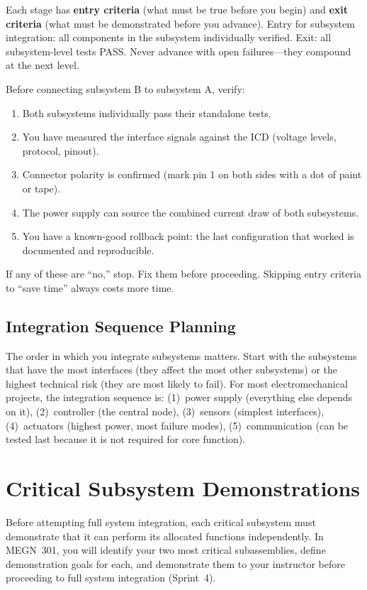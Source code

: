 \documentclass[11pt,letterpaper,twoside,openany]{book}
\begin{document}
Each stage has \textbf{entry criteria} (what must be true before you begin) and \textbf{exit criteria} (what must be demonstrated before you advance). Entry for subsystem integration: all components in the subsystem individually verified. Exit: all subsystem-level tests PASS. Never advance with open failures---they compound at the next level.

\begin{tipbox}
Before connecting subsystem B to subsystem A, verify:
\begin{enumerate}[nosep]
\item Both subsystems individually pass their standalone tests.
\item You have measured the interface signals against the ICD (voltage levels, protocol, pinout).
\item Connector polarity is confirmed (mark pin 1 on both sides with a dot of paint or tape).
\item The power supply can source the combined current draw of both subsystems.
\item You have a known-good rollback point: the last configuration that worked is documented and reproducible.
\end{enumerate}
If any of these are ``no,'' stop. Fix them before proceeding. Skipping entry criteria to ``save time'' always costs more time.
\end{tipbox}

\subsection{Integration Sequence Planning}
The order in which you integrate subsystems matters. Start with the subsystems that have the most interfaces (they affect the most other subsystems) or the highest technical risk (they are most likely to fail). For most electromechanical projects, the integration sequence is: (1)~power supply (everything else depends on it), (2)~controller (the central node), (3)~sensors (simplest interfaces), (4)~actuators (highest power, most failure modes), (5)~communication (can be tested last because it is not required for core function).

\FloatBarrier
\section{Critical Subsystem Demonstrations}
Before attempting full system integration, each critical subsystem must demonstrate that it can perform its allocated functions independently. In MEGN~301, you will identify your two most critical subassemblies, define demonstration goals for each, and demonstrate them to your instructor before proceeding to full system integration (Sprint~4).
\end{document}
